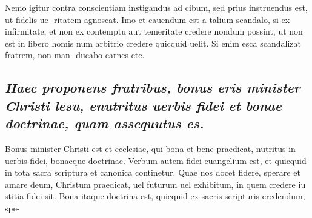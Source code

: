 \documentclass{article}
\begin{document}
\begin{pages}
Nemo igitur contra conscientiam instigandus ad cibum, sed prius instruendus est, ut fidelis ue- ritatem agnoscat. Imo et cauendum est a talium scandalo, si ex infirmitate, et non ex contemptu aut temeritate credere nondum possint, ut non est in libero homis num arbitrio credere quicquid uelit. Si enim esca scandalizat fratrem, non man- ducabo carnes etc.  \pend
{}
{}
\subsection*{\textit{Haec proponens fratribus, bonus eris minister Christi lesu, enutritus uerbis fidei et bonae doctrinae, quam assequutus es. }}\pstart Bonus minister Christi est et ecclesiae, qui bona et bene praedicat, nutritus in uerbis fidei, bonaeque doctrinae. Verbum autem fidei euangelium est, et quicquid in tota sacra scriptura et canonica continetur. Quae nos docet fidere, sperare et amare deum, Christum praedicat, uel futurum uel exhibitum, in quem credere iu stitia fidei sit. Bona itaque doctrina est, quicquid ex sacris scripturis credendum, spe-  \pend

\end{pages}
\end{document}
